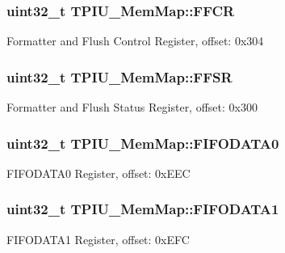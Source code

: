 \subsubsection[{F\+F\+C\+R}]{\setlength{\rightskip}{0pt plus 5cm}uint32\+\_\+t T\+P\+I\+U\+\_\+\+Mem\+Map\+::\+F\+F\+C\+R}\label{struct_t_p_i_u___mem_map_a34d81bddad51a7dcdbf76548b3809d82}
Formatter and Flush Control Register, offset\+: 0x304 \hypertarget{struct_t_p_i_u___mem_map_ada0d6c32bb6a91e5edfcbbe7f37e6fd6}{}
\subsubsection[{F\+F\+S\+R}]{\setlength{\rightskip}{0pt plus 5cm}uint32\+\_\+t T\+P\+I\+U\+\_\+\+Mem\+Map\+::\+F\+F\+S\+R}\label{struct_t_p_i_u___mem_map_ada0d6c32bb6a91e5edfcbbe7f37e6fd6}
Formatter and Flush Status Register, offset\+: 0x300 \hypertarget{struct_t_p_i_u___mem_map_abb1cb9e6415fb7a020856a400197b7bf}{}
\subsubsection[{F\+I\+F\+O\+D\+A\+T\+A0}]{\setlength{\rightskip}{0pt plus 5cm}uint32\+\_\+t T\+P\+I\+U\+\_\+\+Mem\+Map\+::\+F\+I\+F\+O\+D\+A\+T\+A0}\label{struct_t_p_i_u___mem_map_abb1cb9e6415fb7a020856a400197b7bf}
F\+I\+F\+O\+D\+A\+T\+A0 Register, offset\+: 0x\+E\+E\+C \hypertarget{struct_t_p_i_u___mem_map_a49b8e093cff84e13fc33a98587395a39}{}
\subsubsection[{F\+I\+F\+O\+D\+A\+T\+A1}]{\setlength{\rightskip}{0pt plus 5cm}uint32\+\_\+t T\+P\+I\+U\+\_\+\+Mem\+Map\+::\+F\+I\+F\+O\+D\+A\+T\+A1}\label{struct_t_p_i_u___mem_map_a49b8e093cff84e13fc33a98587395a39}
F\+I\+F\+O\+D\+A\+T\+A1 Register, offset\+: 0x\+E\+F\+C \hypertarget{struct_t_p_i_u___mem_map_a86904c5ac326d4cca551c4fb45a9f9ba}{}
